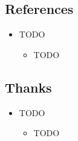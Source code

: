\documentclass[compress]{thesisbeamer}
\begin{document}
        \subsection{References}
        \begin{frame}
        	\begin{itemize}
        		\item 	TODO
        		\begin{itemize}
        			\item TODO
        		\end{itemize}
        	\end{itemize}
        \end{frame}
        	
        \subsection{Thanks}
        \begin{frame}
        	\begin{itemize}
        		\item 	TODO
        		\begin{itemize}
        			\item TODO
        		\end{itemize}
        	\end{itemize}
        \end{frame}
        	
\end{document}
